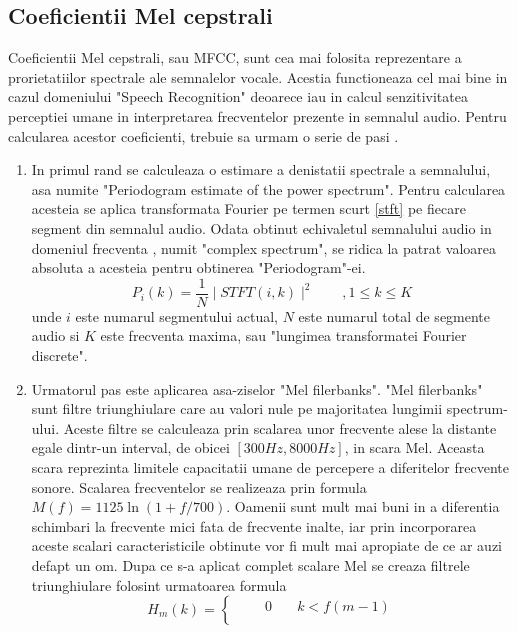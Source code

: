 \documentclass[a4paper,12pt]{book}
\begin{document}
			\subsection{Coeficientii Mel cepstrali}
				Coeficientii Mel cepstrali, sau MFCC, sunt cea mai folosita reprezentare a prorietatiilor spectrale ale semnalelor vocale. Acestia functioneaza cel mai bine in cazul domeniului "Speech Recognition" deoarece iau in calcul senzitivitatea perceptiei umane in interpretarea frecventelor prezente in semnalul audio. Pentru calcularea acestor coeficienti, trebuie sa urmam o serie de pasi \cite{mcs}.
					\begin{enumerate}
						\item 
							In primul rand se calculeaza o estimare a denistatii spectrale a semnalului, asa numite "Periodogram estimate of the power spectrum". Pentru calcularea acesteia se aplica transformata Fourier pe termen scurt \ref{stft} pe fiecare segment din semnalul audio. Odata obtinut echivaletul semnalului audio in domeniul frecventa , numit "complex spectrum", se ridica la patrat valoarea absoluta a acesteia pentru obtinerea "Periodogram"-ei.
							\begin{equation*}
								P_i(k) =\frac{1}{N}\mid STFT(i, k)\mid^2 \quad\quad,1\leq k\leq K
							\end{equation*}
							unde $i$ este numarul segmentului actual, $N$ este numarul total de segmente audio si $K$ este frecventa maxima, sau "lungimea transformatei Fourier discrete".
						\item Urmatorul pas este aplicarea asa-ziselor "Mel filerbanks". "Mel filerbanks" sunt filtre triunghiulare care au valori nule pe majoritatea lungimii spectrum-ului. Aceste filtre se calculeaza prin scalarea unor frecvente alese la distante egale dintr-un interval, de obicei $[300Hz, 8000Hz]$, in scara Mel. Aceasta scara reprezinta limitele capacitatii umane de percepere a diferitelor frecvente sonore. Scalarea frecventelor se realizeaza prin formula $M(f) = 1125 \ln(1+ f/700)$. Oamenii sunt mult mai buni in a diferentia schimbari la frecvente mici fata de frecvente inalte, iar prin incorporarea aceste scalari caracteristicile obtinute vor fi mult mai apropiate de ce ar auzi defapt un om. \newline
						Dupa ce s-a aplicat complet scalare Mel se creaza filtrele triunghiulare folosint urmatoarea formula
						\begin{equation*}
							H_m(k) = 
							\begin{cases}
							\quad \quad 0&\quad k<f(m-1) \\[3pt]

\end{cases}
\end{equation*}
\end{enumerate}
\end{document}
